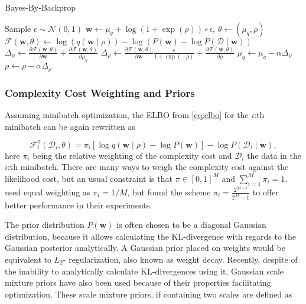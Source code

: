 	
	\begin{algorithm}[h]
		\caption{Bayes-By-Backprop}
		\label{alg:bbb}
		\begin{algorithmic}[1]
			\State Sample $\epsilon \sim \mathcal{N}(0,1)$ 
			\State $ \pmb{w} \gets \mu_q + \log(1 + \exp(\rho)) \circ  \epsilon$, $\theta \gets (\mu_q, \rho)$ 
			\State $\mathcal{F}(\pmb{w}, \theta) \gets \log(q(\pmb{w}\mid \rho)) - \log(P(\pmb{w}) - \log P(\mathcal{D} \mid \pmb{w}))$ 
			\State $\Delta_\mu  \gets \frac{\partial \mathcal{F}(\pmb{w},\theta)}{\partial \pmb{w}} + 
			\frac{\partial \mathcal{F}(\pmb{w},\theta)}{\partial \mu_q}$ 
			\State $\Delta_\rho  \gets \frac{\partial \mathcal{F}(\pmb{w},\theta)}{\partial \pmb{w}}\frac{\epsilon}{1 + \exp(-\rho)} +
			\frac{\partial \mathcal{F}(\pmb{w},\theta)}{\partial \rho}$
			\State $\mu_q \gets \mu_q - \alpha \Delta_\mu$ 
			\State $\rho \gets \rho - \alpha \Delta_\rho$ 
		\end{algorithmic}
	\end{algorithm}
	
	\subsubsection*{Complexity Cost Weighting and Priors}
	
	Assuming minibatch optimization, the ELBO from \eqref{eq:elbo} for the $i$:th minibatch can be again rewritten as 
	
	\begin{equation}
		\mathcal{F}^\pi_i(\mathcal{D}_i, \theta) = \pi_i 
		\left[
		\log q(\pmb{w}\mid \rho) - \log P(\pmb{w}) \right] - \log P(\mathcal{D}_i \mid \pmb{w})
		,
	\end{equation}
	here $\pi_i$ being the relative weighting of the complexity cost and $\mathcal{D}_i$ the data in the $i$:th minibatch. 
	There are many ways to weigh the complexity cost against the likelihood cost, but an usual constraint is that $\pi \in [0,1]^M$ and $\sum_{i=1}^{M} \pi_i = 1$. \citet{graves_practical_2011} used equal weighting as $\pi_i = 1/M$, but \citet{blundell_weight_2015} found the scheme $\pi_i =\frac{2^{M-i}}{2^M - 1}$ to offer better performance in their experiments. 

	
	The prior distribution $P(\pmb{w})$ is often chosen to be a diagonal Gaussian distribution, because it allows calculating the KL-divergence with regards to the Gaussian posterior analytically. A Gaussian prior placed on weights would be equivalent to $L_2$- regularization, also known as weight decay. Recently, despite of the inability to analytically calculate KL-divergences using it, Gaussian scale mixture priors have also been used \cite{blundell_weight_2015, shridhar_comprehensive_2019} because of their properties facilitating optimization. These scale mixture priors, if containing two scales are defined as 
	
